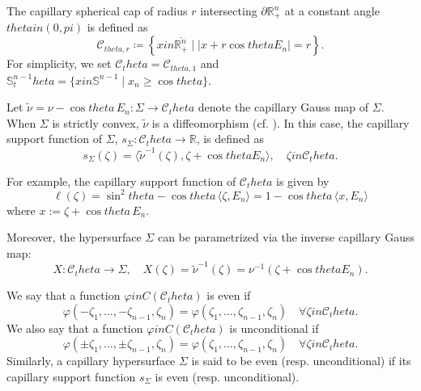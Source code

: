 \documentclass[12pt]{amsart}
\def\theta{theta}%
\def\pi{pi}%
\def\in{in }%
\numberwithin{equation}{section}
\newcommand{\bbR}{\mathbb{R}}
\newcommand{\8}{\infty}
\renewcommand{\(}{\left(}
\renewcommand{\)}{\right)}
\newcommand{\q}{\quad}
\begin{document}
The capillary spherical cap of radius $r$ intersecting $\partial \mathbb{R}^n_+$ at a constant angle $\theta \in (0, \pi)$ is defined as
\begin{equation}
\mathcal{C}_{\theta, r} \coloneqq \left\{ x \in \overline{\mathbb{R}^n_+} \mid |x + r \cos \theta E_n| = r \right\}.
\end{equation}
For simplicity, we set $\mathcal{C}_\theta = \mathcal{C}_{\theta, 1}$ and $\mathbb{S}^{n-1}_\theta = \{ x \in \mathbb{S}^{n-1} \mid x_n \geq \cos\theta \}$.


Let $\tilde{\nu} = \nu - \cos\theta\, E_n : \Sigma \to \mathcal{C}_\theta$ denote the capillary Gauss map of $\Sigma$. When $\Sigma$ is strictly convex, $\tilde{\nu}$ is a diffeomorphism (cf. \cite[Lem. 2.2]{MWWX25}). In this case, the capillary support function of $\Sigma$, $s_\Sigma : \mathcal{C}_\theta\to \bbR$, is defined as
\begin{equation}
s_\Sigma(\zeta) = \langle \tilde{\nu}^{-1}(\zeta), \zeta + \cos\theta E_n \rangle, \quad \zeta \in \mathcal{C}_\theta.
\end{equation}


For example, the capillary support function of $\mathcal{C}_\theta$ is given by
\begin{equation}
\ell(\zeta) = \sin^2\theta - \cos\theta \,\langle \zeta, E_n \rangle = 1 - \cos\theta\, \langle x, E_n \rangle
\end{equation}
where $x := \zeta + \cos\theta\, E_n$.


Moreover, the hypersurface $\Sigma$ can be parametrized via the inverse capillary Gauss map:
\begin{equation}
X : \mathcal{C}_\theta \to \Sigma, \q X(\zeta) = \tilde{\nu}^{-1}(\zeta) = \nu^{-1}(\zeta + \cos\theta E_n).
\end{equation}

We say that a function $\varphi \in C(\mathcal{C}_\theta)$ is even if
\begin{equation}
    \varphi(-\zeta_1, \ldots, -\zeta_{n-1}, \zeta_n) 
    = \varphi(\zeta_1, \ldots, \zeta_{n-1}, \zeta_n)
    \quad \forall \zeta \in \mathcal{C}_\theta.
\end{equation}
We also say that a function $\varphi \in C(\mathcal{C}_\theta)$ is unconditional if
\begin{equation}
    \varphi(\pm \zeta_1, \ldots, \pm \zeta_{n-1}, \zeta_n) 
    = \varphi(\zeta_1, \ldots, \zeta_{n-1}, \zeta_n)
    \quad \forall \zeta \in \mathcal{C}_\theta.
\end{equation}
Similarly, a capillary hypersurface $\Sigma$ is said to be even (resp. unconditional) if its capillary support function $s_\Sigma$ is even (resp. unconditional). 
\end{document}

